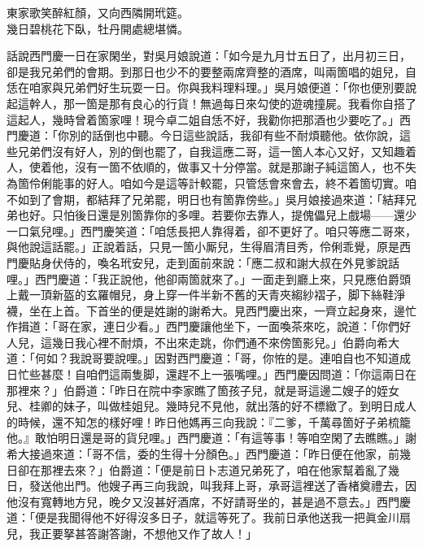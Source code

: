 \begin{myquote}
東家歌笑醉紅顏，又向西隣開玳筵。\\
幾日碧桃花下臥，牡丹開處總堪憐。
\end{myquote}

話說西門慶一日在家閑坐，對吳月娘說道：「如今是九月廿五日了，出月初三日，卻是我兄弟們的會期。到那日也少不的要整兩席齊整的酒席，叫兩箇唱的姐兒，自恁在咱家與兄弟們好生玩耍一日。你與我料理料理。」吳月娘便道：「你也便別要說起這幹人，那一箇是那有良心的行貨！無過每日來勾使的遊魂撞屍。我看你自搭了這起人，幾時曾着箇家哩！{}現今卓二姐自恁不好，我勸你把那酒也少要吃了。」西門慶道：「你別的話倒也中聽。今日這些說話，我卻有些不耐煩聽他。依你說，這些兄弟們沒有好人，別的倒也罷了，自我這應二哥，這一箇人本心又好，又知趣着人，{}使着他，沒有一箇不依順的，做事又十分停當。就是那謝子純這箇人，也不失為箇伶俐能事的好人。咱如今是這等計較罷，只管恁會來會去，終不着箇切實。咱不如到了會期，都結拜了兄弟罷，明日也有箇靠傍些。」吳月娘接過來道：「結拜兄弟也好。只怕後日還是別箇靠你的多哩。若要你去靠人，提傀儡兒上戲場——還少一口氣兒哩。」西門慶笑道：「咱恁長把人靠得着，卻不更好了。咱只等應二哥來，與他說這話罷。」正說着話，只見一箇小厮兒，生得眉清目秀，伶俐乖覺，原是西門慶貼身伏侍的，喚名玳安兒，走到面前來說：「應二叔和謝大叔在外見爹說話哩。」西門慶道：「我正說他，他卻兩箇就來了。」一面走到廳上來，只見應伯爵頭上戴一頂新盔的玄羅帽兒，身上穿一件半新不舊的天青夾縐紗褶子，脚下絲鞋淨襪，坐在上首。下首坐的便是姓謝的謝希大。見西門慶出來，一齊立起身來，邊忙作揖道：「哥在家，連日少看。」西門慶讓他坐下，一面喚茶來吃，說道：「你們好人兒，這幾日我心裡不耐煩，不出來走跳，你們通不來傍箇影兒。」伯爵向希大道：「何如？我說哥要說哩。」因對西門慶道：「哥，你恠的是。連咱自也不知道成日忙些甚麼！自咱們這兩隻脚，還趕不上一張嘴哩。」西門慶因問道：「你這兩日在那裡來？」伯爵道：「昨日在院中李家瞧了箇孩子兒，就是哥這邊二嫂子的姪女兒、桂卿的妹子，叫做桂姐兒。幾時兒不見他，就出落的好不標緻了。到明日成人的時候，還不知怎的樣好哩！昨日他媽再三向我說：『二爹，千萬尋箇好子弟梳籠他。』敢怕明日還是哥的貨兒哩。」{}西門慶道：「有這等事！等咱空閑了去瞧瞧。」謝希大接過來道：「哥不信，委的生得十分顏色。」西門慶道：「昨日便在他家，前幾日卻在那裡去來？」伯爵道：「便是前日卜志道兄弟死了，咱在他家幫着亂了幾日，發送他出門。{}他嫂子再三向我說，叫我拜上哥，承哥這裡送了香楮奠禮去，因他沒有寬轉地方兒，晚夕又沒甚好酒席，不好請哥坐的，甚是過不意去。」西門慶道：「便是我聞得他不好得沒多日子，就這等死了。我前日承他送我一把眞金川扇兒，我正要拏甚答謝答謝，不想他又作了故人！」

